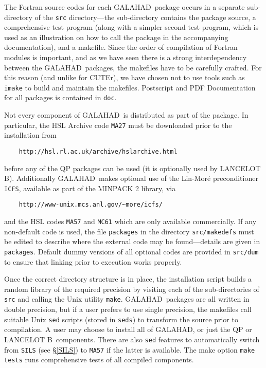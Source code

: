 \documentclass[twoside]{article}
\newcommand{\gal}{{\sf GALAHAD}}
\newcommand{\lanb}{{\sf LANCELOT B}}
\newcommand{\cuter}{{\sf CUTEr}}
\begin{document}
The Fortran source codes for each \gal\ package occurs 
in a separate sub-directory of the {\tt src} directory---the sub-directory
contains the package source, a comprehensive test program (along with
a simpler second test program, which is used as an illustration on how
to call the package in the accompanying documentation), and a makefile.
Since the order of compilation of Fortran modules is important, and as
we have seen there is a strong interdependency between the \gal\ packages,
the makefiles have to be carefully crafted. For this reason (and unlike
for \cuter), we have chosen not to use tools such as {\tt imake} to build and
maintain the makefiles. Postscript and PDF Documentation for all packages
is contained in {\tt doc}.

Not every component of \gal\ is distributed as part of the package. In
particular, the HSL Archive code {\tt MA27} must be downloaded prior to 
the installation from
\begin{verbatim}
    http://hsl.rl.ac.uk/archive/hslarchive.html 
\end{verbatim}
before any of the QP packages can be used (it is optionally used by \lanb).
Additionally \gal\ makes optional use of the 
Lin-Mor\'{e} preconditioner {\tt ICFS}, available as
part of the MINPACK 2 library, via
\begin{verbatim}
    http://www-unix.mcs.anl.gov/~more/icfs/ 
\end{verbatim}
and the HSL codes {\tt MA57} and {\tt MC61} which are only available
commercially. If any non-default code is used, the file {\tt packages}
in the directory {\tt src/makedefs} must be edited to describe where
the external code may be found---details are given in {\tt packages}.
Default dummy versions of all optional codes are provided in 
{\tt src/dum} to ensure that linking prior to execution works properly.

Once the correct directory structure is in place, the installation script
builds a random library of the required precision by visiting each 
of the sub-directories of {\tt src} and calling the Unix utility {\tt make}.
\gal\ packages are all written in double precision, but if a user prefers to
use single precision, the makefiles call suitable Unix {\tt sed} 
scripts (stored in {\tt seds}) to transform the source prior to compilation.
A user may choose to install all of \gal, or just the QP or \lanb\ components.
There are also {\tt sed} features to automatically switch from {\tt SILS} (see
 \S\ref{SILS}) to {\tt MA57} if the latter is available.
The make option {\tt make tests} runs comprehensive tests of all 
compiled components.
\end{document}
